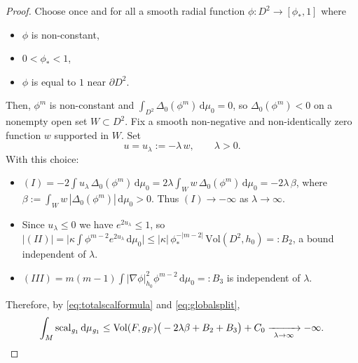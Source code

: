 \documentclass[12pt,a4paper]{amsart}
\theoremstyle{plain}
\theoremstyle{definition}
\theoremstyle{remark}
\newcommand{\ga}{\mathit{g}} %
\begin{document}
\begin{proof}
Choose once and for all a smooth radial function $\phi\colon D^2\to[\phi_*,1]$ where
\begin{itemize}
\item $\phi$ is non-constant,
    \item $0<\phi_*<1$,
    \item $\phi$ is equal to  $1$ near $\partial D^2$.
\end{itemize}
Then, $\phi^m$ is non-constant and
$\int_{D^2}\Delta_0(\phi^m)\,\mathrm{d}\mu_0=0$, so $\Delta_0(\phi^m)<0$ on a nonempty open set
$W\subset D^2$. Fix a smooth non-negative and non-identically zero function $w$ supported in $W$. Set
\[
u=u_\lambda:=-\lambda\,w,\qquad \lambda>0 .
\]
With this choice:
\begin{itemize}
\item $(I)=-2\!\int u_\lambda\,\Delta_0(\phi^m)\,\mathrm{d}\mu_0
        =2\lambda\!\int_W w\,\Delta_0(\phi^m)\,\mathrm{d}\mu_0=-2\lambda\,\beta$, where
        $\beta:=\int_W w\,|\Delta_0(\phi^m)|\,\mathrm{d}\mu_0>0$. Thus $(I)\to-\infty$ as
        $\lambda\to\infty$.
\item Since $u_\lambda\le 0$ we have $e^{2u_\lambda}\le 1$, so
        $|(II)|=\Big|\kappa\!\int\phi^{m-2}e^{2u_\lambda}\,\mathrm{d}\mu_0\Big|
        \le|\kappa|\,\phi_*^{-|m-2|}\,\mathrm{Vol}(D^2,h_0)=:B_2$,
        a bound independent of $\lambda$.
\item $(III)=m(m-1)\!\int|\nabla\phi|_{h_0}^2\phi^{m-2}\,\mathrm{d}\mu_0=:B_3$ is independent of
        $\lambda$.
\end{itemize}
Therefore, by \eqref{eq:totalscalformula} and \eqref{eq:globalsplit},
\[
\int_M\mathrm{scal}_{\ga_1}\,\mathrm{d}\mu_{\ga_1}
\le \mathrm{Vol}(F,g_F)\big(-2\lambda\beta+B_2+B_3\big)+C_0
\xrightarrow[\ \lambda\to\infty\ ]{}-\infty. \qedhere
\]
\end{proof}
\end{document}
